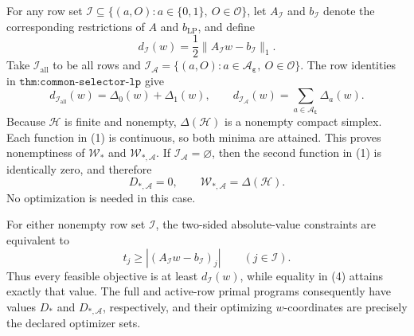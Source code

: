 For any row set \(\mathcal I\subseteq\{(a,O):a\in\{0,1\},\ O\in\mathcal O\}\), let \(A_{\mathcal I}\) and \(b_{\mathcal I}\) denote the corresponding restrictions of \(A\) and \(b_{\mathrm{LP}}\), and define
\[
d_{\mathcal I}(w)=\frac12\lVert A_{\mathcal I}w-b_{\mathcal I}\rVert_1.
\tag{1}
\]
Take \(\mathcal I_{\mathrm{all}}\) to be all rows and \(\mathcal I_{\mathcal A}=\{(a,O):a\in\mathcal A_{\boldsymbol\varepsilon},\ O\in\mathcal O\}\). The row identities in \(\texttt{thm:common-selector-lp}\) give
\[
d_{\mathcal I_{\mathrm{all}}}(w)=\Delta_0(w)+\Delta_1(w),\qquad
d_{\mathcal I_{\mathcal A}}(w)=\sum_{a\in\mathcal A_{\boldsymbol\varepsilon}}\Delta_a(w).
\tag{2}
\]
Because \(\mathcal H\) is finite and nonempty, \(\Delta(\mathcal H)\) is a nonempty compact simplex. Each function in (1) is continuous, so both minima are attained. This proves nonemptiness of \(\mathcal W_*\) and \(\mathcal W_{*,\mathcal A}\). If \(\mathcal I_{\mathcal A}=\varnothing\), then the second function in (1) is identically zero, and therefore
\[
D_{*,\mathcal A}=0,\qquad \mathcal W_{*,\mathcal A}=\Delta(\mathcal H).
\tag{3}
\]
No optimization is needed in this case.

For either nonempty row set \(\mathcal I\), the two-sided absolute-value constraints are equivalent to
\[
t_j\ge |(A_{\mathcal I}w-b_{\mathcal I})_j|\qquad(j\in\mathcal I).
\tag{4}
\]
Thus every feasible objective is at least \(d_{\mathcal I}(w)\), while equality in (4) attains exactly that value. The full and active-row primal programs consequently have values \(D_*\) and \(D_{*,\mathcal A}\), respectively, and their optimizing \(w\)-coordinates are precisely the declared optimizer sets.

